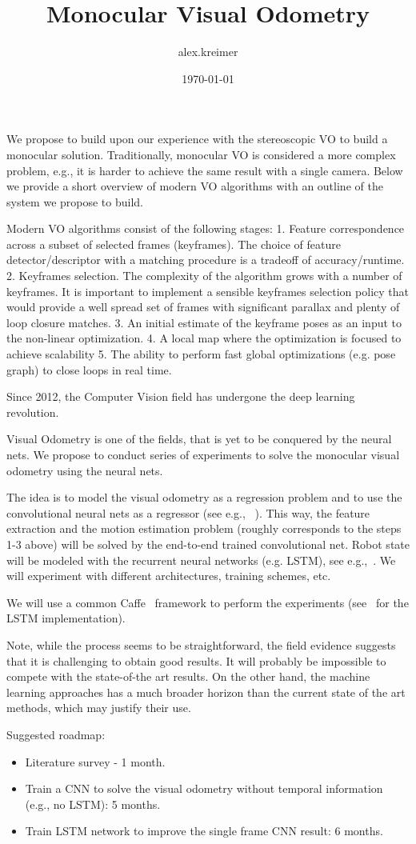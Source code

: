 \documentclass{article}
\title{Monocular Visual Odometry}
\author{alex.kreimer}
\date{\today}
\begin{document}
\maketitle
We propose to build upon our experience with the stereoscopic VO to build a monocular solution.  Traditionally, monocular VO is considered a more complex problem, e.g., it is harder to achieve the same result with a single camera.  Below we provide a short overview of modern VO algorithms with an outline of the system we propose to build.

Modern VO algorithms consist of the following stages:
1. Feature correspondence across a subset of selected frames (keyframes).  The choice of feature detector/descriptor with a matching procedure is a tradeoff of accuracy/runtime. 
2. Keyframes selection.  The complexity of the algorithm grows with a number of keyframes. It is important to implement a sensible keyframes selection policy that would provide a well spread set of frames with significant parallax and plenty of loop closure matches.
3. An initial estimate of the keyframe poses as an input to the non-linear optimization.
4. A local map where the optimization is focused to achieve scalability
5. The ability to perform fast global optimizations (e.g. pose graph) to close loops in real time.

Since 2012, the Computer Vision field has undergone the deep learning revolution.

Visual Odometry is one of the fields, that is yet to be conquered by the neural nets.  We propose to conduct series of experiments to solve the monocular visual odometry using the neural nets.

The idea is to model the visual odometry as a regression problem and
to use the convolutional neural nets as a regressor (see e.g.,
~\cite{MohantyADGSC16}). This way, the feature extraction and the
motion estimation problem (roughly corresponds to the steps 1-3 above)
will be solved by the end-to-end trained convolutional net.  Robot
state will be modeled with the recurrent neural networks (e.g. LSTM),
see e.g.,~\cite{ClarkWWMT17}.  We will experiment with different
architectures, training schemes, etc.

We will use a common Caffe~\cite{JiaSDKLGGD14} framework to perform
the experiments (see~\cite{DonahueHGRVSD14} for the LSTM
implementation).

Note, while the process seems to be straightforward, the field evidence suggests that it is challenging to obtain good results.  It will probably be impossible to compete with the state-of-the art results.  On the other hand, the machine learning approaches has a much broader horizon than the current state of the art methods, which may justify their use.

Suggested roadmap:
\begin{itemize}
\item Literature survey - 1 month.
\item Train a CNN to solve the visual odometry without temporal information (e.g., no LSTM): 5 months.
\item Train LSTM network to improve the single frame CNN result: 6 months.
\end{itemize}

\printbibliography
\end{document}
